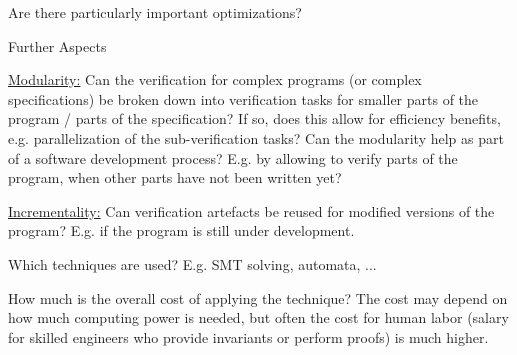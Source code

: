 \documentclass[a4paper]{article}
\begin{document}
\begin{minipage}[t]{0.16\linewidth}
\begin{betterlist}
\begin{betterlist}
			\item Are there particularly important optimizations?

		\end{betterlist}
		\item \alert{Further Aspects}
		\begin{betterlist}
			\item \underline{Modularity:} Can the verification for complex programs (or complex specifications) be broken down into verification tasks for smaller parts of the program / parts of the specification? If so, does this allow for efficiency benefits, e.g. parallelization of the sub-verification tasks? Can the modularity help as part of a software development process? E.g. by allowing to verify parts of the program, when other parts have not been written yet?

			\item \underline{Incrementality:} Can verification artefacts be reused for modified versions of the program? E.g. if the program is still under development.

			\item Which techniques are used? E.g. SMT solving, automata, ...

			\item How much is the overall cost of applying the technique? The cost may depend on how much computing power is needed, but often the cost for human labor (salary for skilled engineers who provide invariants or perform proofs) is much higher.

		\end{betterlist}
	\end{betterlist}

\end{minipage}
\end{document}
